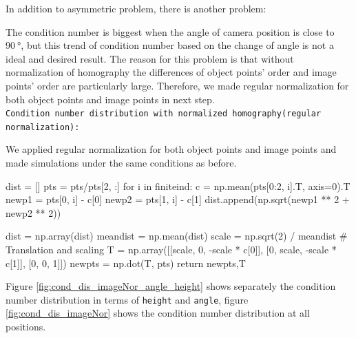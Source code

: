 In addition to asymmetric problem, there is another problem: 

The condition number is biggest when the angle of camera position is close to $\SI{90}{\degree}$, but this trend of condition number based on the change of angle is not a ideal and desired result. The reason for this problem is that without normalization of homography the differences of object points' order and image points' order are particularly large\cite{hartley2000multiple}. Therefore, we made regular normalization for both object points and image points in next step.\\

\texttt{Condition number distribution with normalized homography(regular normalization):}

We applied regular normalization for both object points and image points and made simulations under the same conditions as before.
 
\begin{python}\label{python:regular}
dist = []
pts = pts/pts[2, :]
for i in finiteind:
    c = np.mean(pts[0:2, i].T, axis=0).T
    newp1 = pts[0, i] - c[0]
    newp2 = pts[1, i] - c[1]
    dist.append(np.sqrt(newp1 ** 2 + newp2 ** 2))

dist = np.array(dist)
meandist = np.mean(dist)
scale = np.sqrt(2) / meandist # Translation and scaling
T = np.array([[scale, 0, -scale * c[0]], [0, scale, -scale * c[1]], [0, 0, 1]])
newpts = np.dot(T, pts)
return newpts,T
\end{python}

Figure \ref{fig:cond_dis_imageNor_angle_height} shows separately the condition number distribution in terms of \texttt{height} and \texttt{angle}, figure \ref{fig:cond_dis_imageNor} shows the condition number distribution at all positions.

